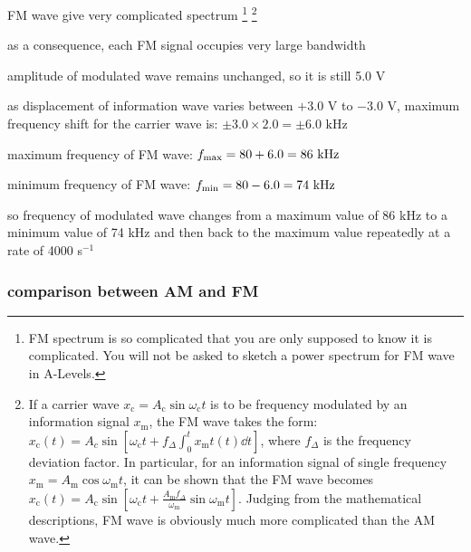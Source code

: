 \cmt FM wave give very complicated spectrum
\footnote{FM spectrum is so complicated that you are only supposed to know it is complicated. You will not be asked to sketch a power spectrum for FM wave in A-Levels.}
\footnote{If a carrier wave $x_\text{c} = A_\text{c} \sin \omega_\text{c} t$ is to be frequency modulated by an information signal $x_\text{m}$, the FM wave takes the form: $x_\text{c}(t) = A_c \sin \left[ \omega_\text{c}t + f_\Delta \int_0^t x_\text{m}t(t) \dd t \right]$, where $f_\Delta$ is the frequency deviation factor. In particular, for an information signal of single frequency $x_\text{m} = A_\text{m} \cos\omega_\text{m} t$, it can be shown that the FM wave becomes $ x_\text{c}(t) = A_\text{c} \sin \left[\omega_\text{c} t + \frac{A_\text{m}f_\Delta}{\omega_\text{m}} \sin \omega_\text{m} t\right]$. Judging from the mathematical descriptions, FM wave is obviously much more complicated than the AM wave.}

as a consequence, each FM signal occupies very large bandwidth


\sol amplitude of modulated wave remains unchanged, so it is still 5.0 V

as displacement of information wave varies between $+3.0$ V to $-3.0$ V, maximum frequency shift for the carrier wave is: $\pm 3.0 \times 2.0 = \pm 6.0 \text{ kHz}$

maximum frequency of FM wave: $f_{\text{max}} = 80 + 6.0 = 86 \text{ kHz}$

minimum frequency of FM wave: $f_{\text{min}} = 80 - 6.0 = 74 \text{ kHz}$

so frequency of modulated wave changes from a maximum value of 86 kHz to a minimum value of 74 kHz and then back to the maximum value repeatedly at a rate of 4000 s$^{-1}$ \eoe




\subsubsection{comparison between AM and FM}

